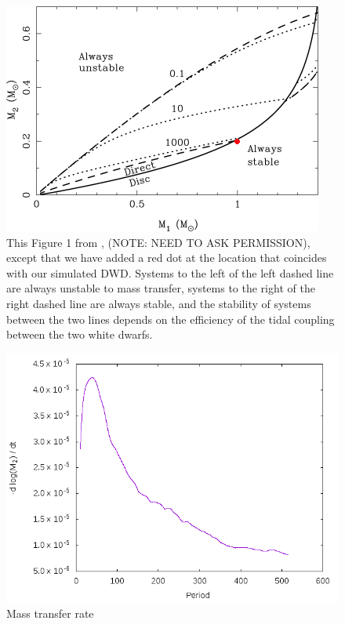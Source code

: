 \documentclass[preprint]{aastex}
\begin{document}
\begin{figure}
\includegraphics{./images/MNS2004.png}
\caption{This Figure 1 from \cite{MNS2004}, (NOTE: NEED TO ASK PERMISSION), except that we have added a red dot at the location that coincides with our simulated DWD. Systems to the 
left of the left dashed line are always unstable to mass transfer, systems to the right of the right dashed line are always stable, and the stability of systems between the two lines 
depends on the efficiency of the tidal coupling between the two white dwarfs.}
\label{mns2004_fig}
\end{figure}

\begin{figure}
\includegraphics{./images/mdot.png}
\caption{Mass transfer rate}
\label{mdot_fig}
\end{figure}
\end{document}
